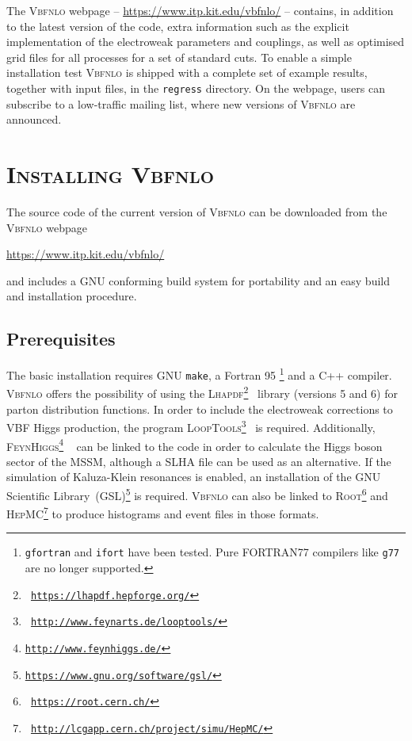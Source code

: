 \documentclass[english,12pt]{article}
\begin{document}
The \textsc{Vbfnlo} webpage -- 
\url{https://www.itp.kit.edu/vbfnlo/} -- contains, in addition to
the latest version of the code, extra information such as the explicit
implementation of the electroweak parameters and couplings, as well as optimised
grid files for all processes for a set of standard cuts.  To enable a simple installation test
\textsc{Vbfnlo} is shipped with a complete set of example results, together
with input files, in the {\tt regress} directory.  On the webpage, users can subscribe to
a low-traffic mailing list, where new versions of \textsc{Vbfnlo} are announced.


\newpage

\section{\textsc{Installing Vbfnlo}}

The source code of the current version of \textsc{Vbfnlo} can be
downloaded from the \textsc{Vbfnlo} webpage
%
\begin{center}
\url{https://www.itp.kit.edu/vbfnlo/}
\end{center}
%
and includes a GNU conforming build system for portability and an
easy build and installation procedure.

\subsection{Prerequisites}

The basic installation requires GNU {\tt make}, a {\sc Fortran} 95 \footnote{{\tt gfortran}
and {\tt ifort} have been tested. Pure FORTRAN77 compilers like {\tt g77} are no longer supported.} and a C++ compiler.
\textsc{Vbfnlo} offers the possibility of using the \textsc{Lhapdf}\footnote{\tt
\url{https://lhapdf.hepforge.org/}}~\cite{Whalley:2005nh} library (versions 5 and 6) for parton
distribution functions. In order to include the electroweak corrections to VBF
Higgs production, the program \textsc{LoopTools}\footnote{\tt
\url{http://www.feynarts.de/looptools/}}~\cite{Hahn:1998yk,Hahn:2006qw} is required.
Additionally, \textsc{FeynHiggs}\footnote{\tt \url{http://www.feynhiggs.de/}}
~\cite{Frank:2006yh,Degrassi:2002fi,Heinemeyer:1998np,Heinemeyer:1998yj} can be
linked to the code in order to calculate the Higgs boson sector of the MSSM,
although a SLHA file can be used as an alternative.  If the simulation of
Kaluza-Klein resonances is enabled, an installation of the GNU Scientific
Library~(GSL)\footnote{\tt \url{https://www.gnu.org/software/gsl/}} is required.
\textsc{Vbfnlo} can also be linked to \textsc{Root}\footnote{\tt
\url{https://root.cern.ch/}} and \textsc{HepMC}\footnote{\tt
\url{http://lcgapp.cern.ch/project/simu/HepMC/}} to produce histograms and event files
in those formats. 
\end{document}
